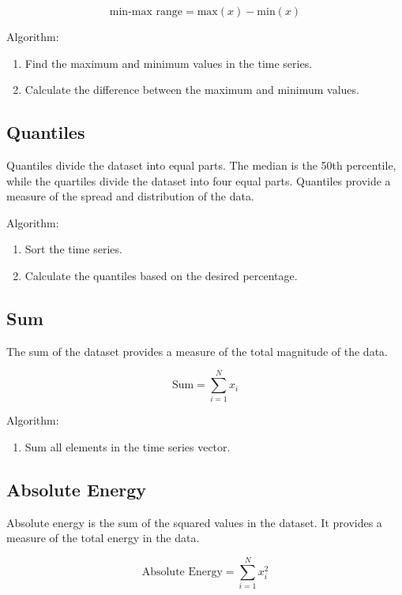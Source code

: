 \begin{equation}
    \text{min-max range} = \text{max}(x) - \text{min}(x)
    \label{eq:min_max_range}
\end{equation}

Algorithm:
\begin{enumerate}
    \item Find the maximum and minimum values in the time series.
    \item Calculate the difference between the maximum and minimum values.
\end{enumerate}

\subsection{Quantiles}
Quantiles divide the dataset into equal parts. The median is the 50th percentile, while the quartiles divide the dataset into four equal parts. Quantiles provide a measure of the spread and distribution of the data.

Algorithm:
\begin{enumerate}
    \item Sort the time series.
    \item Calculate the quantiles based on the desired percentage.
\end{enumerate}

\subsection{Sum}
The sum of the dataset provides a measure of the total magnitude of the data.

\begin{equation}
    \text{Sum} = \sum_{i=1}^{N} x_i
    \label{eq:sum}
\end{equation}

Algorithm:
\begin{enumerate}
    \item Sum all elements in the time series vector.
\end{enumerate}

\subsection{Absolute Energy}
Absolute energy is the sum of the squared values in the dataset. It provides a measure of the total energy in the data.

\begin{equation}
    \text{Absolute Energy} = \sum_{i=1}^{N} x_i^2
    \label{eq:absolute_energy}
\end{equation}

